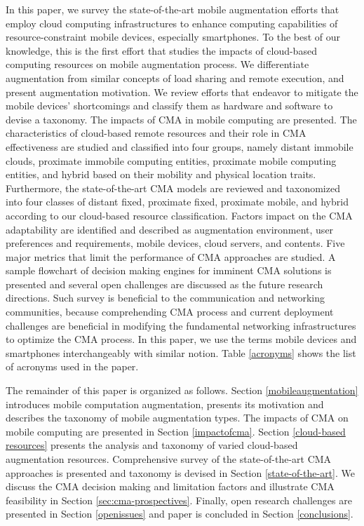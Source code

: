 \documentclass[publish]{IEEEtran}
\begin{document}
In this paper, we survey the state-of-the-art mobile augmentation efforts that employ cloud computing infrastructures to enhance computing capabilities of resource-constraint mobile devices, especially smartphones. To the best of our knowledge, this is the first effort that studies the impacts of cloud-based computing resources on mobile augmentation process. We differentiate augmentation from similar concepts of load sharing and remote execution, and present augmentation motivation. We review efforts that endeavor to mitigate the mobile devices' shortcomings and classify them as hardware and software to devise a taxonomy. The impacts of CMA in mobile computing are presented. The characteristics of cloud-based remote resources and their role in CMA effectiveness are studied and classified into four groups, namely distant immobile clouds, proximate immobile computing entities, proximate mobile computing entities, and hybrid based on their mobility and physical location traits. Furthermore, the state-of-the-art CMA models are reviewed and taxonomized into four classes of distant fixed, proximate fixed, proximate mobile, and hybrid according to our cloud-based resource classification. Factors impact on the CMA adaptability are identified and described as augmentation environment, user preferences and requirements, mobile devices, cloud servers, and contents. Five major metrics that limit the performance of CMA approaches are studied. A sample flowchart of decision making engines for imminent CMA solutions is presented and several open challenges are discussed as the future research directions. Such survey is beneficial to the communication and networking communities, because comprehending CMA process and current deployment challenges are beneficial in modifying the fundamental networking infrastructures to optimize the CMA process. In this paper, we use the terms mobile devices and smartphones interchangeably with similar notion. Table \ref{acronyms} shows the list of acronyms used in the paper.

The remainder of this paper is organized as follows. Section \ref{mobileaugmentation} introduces mobile computation augmentation, presents its motivation and describes the taxonomy of mobile augmentation types. The impacts of CMA on mobile computing are presented in Section \ref{impactofcma}. Section \ref{cloud-based resources} presents the analysis and taxonomy of varied cloud-based augmentation resources. Comprehensive survey of the state-of-the-art CMA approaches is presented and taxonomy is devised in Section \ref{state-of-the-art}. We discuss the CMA decision making and limitation factors and illustrate CMA feasibility in Section \ref{sec:cma-prospectives}. Finally, open research challenges are presented in Section \ref{openissues} and paper is concluded in Section \ref{conclusions}. 
\end{document}
